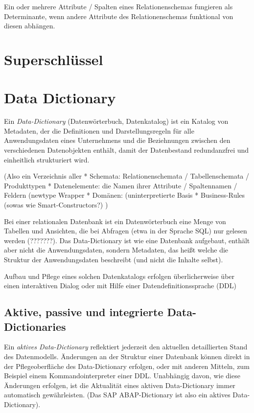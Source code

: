 \documentclass{scrbook}
\begin{document}
Ein oder mehrere Attribute / Spalten eines Relationenschemas fungieren als Determinante,
wenn andere Attribute des Relationenschemas funktional von diesen abhängen.



\section{Superschlüssel}


\section{Data Dictionary}
%

Ein \emph{Data-Dictionary} (Datenwörterbuch, Datenkatalog) ist ein Katalog 
von Metadaten, der die Definitionen und Darstellungsregeln für alle Anwendungsdaten
eines Unternehmens und die Beziehnungen zwischen den verschiedenen Datenobjekten enthält,
damit der Datenbestand redundanzfrei und einheitlich strukturiert wird.

(Also ein Verzeichnis aller 
* Schemata: Relationenschemata / Tabellenschemata / Produkttypen
* Datenelemente: die Namen ihrer Attribute / Spaltennamen / Feldern
	(newtype Wrapper 
* Domänen: (uninterpretierte Basis
* Business-Rules (sowas wie Smart-Constructors?)
)


Bei einer relationalen Datenbank ist ein Datenwörterbuch eine Menge von Tabellen
und Ansichten, die bei Abfragen (etwa in der Sprache SQL) nur gelesen werden (???????).
Das Data-Dictionary ist wie eine Datenbank aufgebaut, enthält aber nicht die Anwendungsdaten,
sondern Metadaten, das heißt welche die Struktur der Anwendungsdaten beschreibt
(und nicht die Inhalte selbst).

Aufbau und Pflege eines solchen Datenkatalogs erfolgen überlicherweise über einen interaktiven
Dialog oder mit Hilfe einer Datendefinitionssprache (DDL)


\subsection{Aktive, passive und integrierte Data-Dictionaries}

Ein \emph{aktives Data-Dictionary} reflektiert jederzeit den aktuellen detaillierten 
Stand des Datenmodells.
Änderungen an der Struktur einer Datenbank können direkt in der Pflegeoberfläche des 
Data-Dictionary erfolgen, oder mit anderen Mitteln, zum Beispiel einem Kommandointerpreter
einer DDL.
Unabhängig davon, wie diese Änderungen erfolgen, ist die Aktualität eines aktiven 
Data-Dictionary immer automatisch gewährleisten.
(Das SAP ABAP-Dictionary ist also ein aktives Data-Dictionary).
\end{document}
